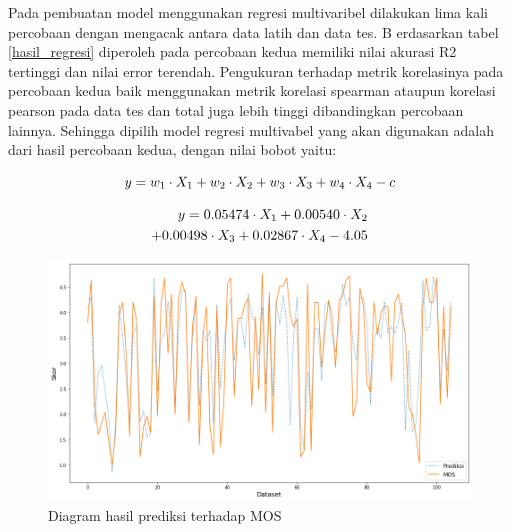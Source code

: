 Pada pembuatan model menggunakan regresi multivaribel dilakukan lima kali percobaan dengan mengacak antara data latih dan data tes. B erdasarkan tabel \ref{hasil_regresi} diperoleh pada percobaan kedua memiliki nilai akurasi R2 tertinggi dan nilai error terendah. Pengukuran terhadap metrik korelasinya pada percobaan kedua baik menggunakan metrik korelasi spearman ataupun korelasi pearson pada data tes dan total juga lebih tinggi dibandingkan percobaan lainnya. Sehingga dipilih model regresi multivabel yang akan digunakan adalah dari hasil percobaan kedua, dengan nilai bobot yaitu:


\begin{equation} 
	\label{eq.regresi}
	y=w_1\cdot{X_1}+w_2\cdot{X_2}+w_3\cdot{X_3}+w_4\cdot{X_4}-c
	\vspace{0.5cm}
\end{equation}

\begin{equation} 
	\label{eq.regresi}
	\begin{aligned}
	y=0.05474\cdot{X_1}+0.00540\cdot{X_2} \\
			+0.00498\cdot{X_3}+0.02867\cdot{X_4}-4.05
	\end{aligned}
	\vspace{0.5cm}
\end{equation}


\begin{figure}[H]
	\vspace{-0.1cm}
	\begin{center}
		\includegraphics[width=1\columnwidth]{bab4/Gambar/diagram-regresi.png}
	\end{center}
	\vspace{-0.2cm}
	\caption{Diagram hasil prediksi terhadap MOS}
		\label{diagram_regresi}
	\end{figure}

